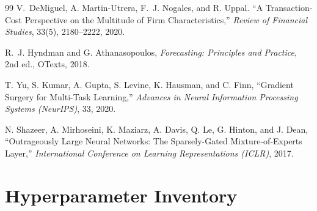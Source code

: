 \documentclass[11pt]{article}
\begin{document}
\begin{thebibliography}{99}
V.~DeMiguel, A. Martin-Utrera, F.~J. Nogales, and R. Uppal.
``A Transaction-Cost Perspective on the Multitude of Firm
Characteristics,'' \emph{Review of Financial Studies}, 33(5),
2180--2222, 2020.

R.~J. Hyndman and G. Athanasopoulos, \emph{Forecasting: Principles
and Practice}, 2nd ed., OTexts, 2018.

T. Yu, S. Kumar, A. Gupta, S. Levine, K. Hausman, and C. Finn,
``Gradient Surgery for Multi-Task Learning,'' \emph{Advances in Neural
Information Processing Systems (NeurIPS)}, 33, 2020.

N. Shazeer, A. Mirhoseini, K. Maziarz, A. Davis, Q. Le, G. Hinton,
and J. Dean, ``Outrageously Large Neural Networks: The Sparsely-Gated
Mixture-of-Experts Layer,'' \emph{International Conference on
Learning Representations (ICLR)}, 2017.

\end{thebibliography}

\appendix
\section{Hyperparameter Inventory}\label{app:hp}
\end{document}
